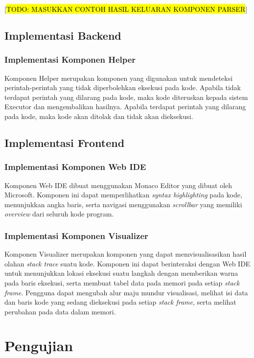   [\hl{TODO: MASUKKAN CONTOH HASIL KELUARAN KOMPONEN PARSER}]

\subsection{Implementasi Backend}
\subsubsection{Implementasi Komponen Helper}
Komponen Helper merupakan komponen yang digunakan untuk mendeteksi perintah-perintah yang tidak diperbolehkan eksekusi pada kode. Apabila tidak terdapat perintah yang dilarang pada kode, maka kode diteruskan kepada sistem Executor dan mengembalikan hasilnya. Apabila terdapat perintah yang dilarang pada kode, maka kode akan ditolak dan tidak akan dieksekusi.


\subsection{Implementasi Frontend}

\subsubsection{Implementasi Komponen Web IDE}
Komponen Web IDE dibuat menggunakan Monaco Editor yang dibuat oleh Microsoft. Komponen ini dapat memperlihatkan \textit{syntax highlighting} pada kode, menunjukkan angka baris, serta navigasi menggunakan \textit{scrollbar} yang memiliki \textit{overview} dari seluruh kode program.

\subsubsection{Implementasi Komponen Visualizer}
Komponen Visualizer merupakan komponen yang dapat memvisualisasikan hasil olahan \textit{stack trace} suatu kode. Komponen ini dapat berinteraksi dengan Web IDE untuk menunjukkan lokasi eksekusi suatu langkah dengan memberikan warna pada baris eksekusi, serta membuat tabel data pada memori pada setiap \textit{stack frame}. Pengguna dapat mengubah alur maju mundur visualisasi, melihat isi data dan baris kode yang sedang dieksekusi pada setiap \textit{stack frame}, serta melihat perubahan pada data dalam memori.


\section{Pengujian}

